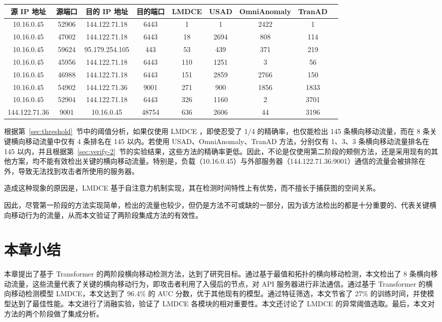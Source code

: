 {\begin{table}[t]
    \label{tab:experiment-rank}
    \centering
    \footnotesize%
    \setlength{\tabcolsep}{4pt}%
    \renewcommand{\arraystretch}{1.2}%
    \begin{tabular}{ccccccccc}
        \hline
        源 IP 地址 & 源端口 & 目的 IP 地址 & 目的端口 & LMDCE & USAD & OmniAnomaly & TranAD\\
        \hline
        10.16.0.45 & 52906 & 144.122.71.18 & 6443 & 1 & 1 & 2422 & 1\\
        10.16.0.45 & 47002 & 144.122.71.18 & 6443 & 18 & 2694 & 808 & 114\\
        10.16.0.45 & 59624 & 95.179.254.105 & 443 & 53 & 439 & 371 & 219\\
        10.16.0.45 & 45956 & 144.122.71.18 & 6443 & 110 & 1251 & 3 & 56\\
        10.16.0.45 & 46988 & 144.122.71.18 & 6443 & 151 & 2859 & 2766 & 150\\
        10.16.0.45 & 54902 & 144.122.71.36 & 9001 & 271 & 900 & 1856 & 1833\\
        10.16.0.45 & 52904 & 144.122.71.18 & 6443 & 326 & 1160 & 2 & 3701\\
        144.122.71.36 & 9001 & 10.16.0.45 & 48754 & 636 & 2606 & 44 & 3196\\
        \hline
    \end{tabular}
\end{table}

根据第~\ref{sec:threshold}~节中的阈值分析，如果仅使用 LMDCE ，即使忍受了 1/4 的精确率，也仅能检出 145 条横向移动流量，而在 8 条关键横向移动流量中仅有 4 条排名在 145 以内。若使用 USAD、OmniAnomaly、TranAD 方法，分别仅有 1、3、3 条横向移动流量排名在 145 以内，并且根据第~\ref{sec:verify-2}~节的实验结果，这些方法的精确率更低。因此，不论是仅使用第二阶段的颊侧方法，还是采用现有的其他方案，均不能有效检出关键的横向移动流量。特别是，负载（10.16.0.45）与外部服务器（144.122.71.36:9001）通信的流量会被排除在外，导致无法找到攻击者所使用的服务器。

造成这种现象的原因是，LMDCE 基于自注意力机制实现，其在检测时间特性上有优势，而不擅长于捕获图的空间关系。

因此，尽管第一阶段的方法实现简单，检出的流量也较少，但仍是方法不可或缺的一部分，因为该方法检出的都是十分重要的、代表关键横向移动行为的流量，从而本文验证了两阶段集成方法的有效性。

\section{本章小结}

本章提出了基于 Transformer 的两阶段横向移动检测方法，达到了研究目标。通过基于最值和拓扑的横向移动检测，本文检出了 8 条横向移动流量，这些流量代表了关键的横向移动行为，即攻击者利用了入侵后的节点，对 API 服务器进行非法通信。通过基于 Transformer 的横向移动检测模型 LMDCE，本文达到了 96.4\% 的 AUC 分数，优于其他现有的模型。通过特征筛选，本文节省了 27\% 的训练时间，并使模型达到了最佳性能。本文进行了消融实验，验证了 LMDCE 各模块的相对重要性。本文还讨论了 LMDCE 的异常阈值选取。最后，本文对方法的两个阶段做了集成分析。

}
